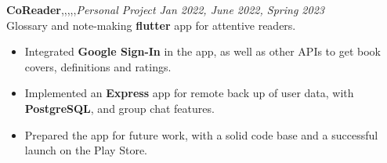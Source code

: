 \textbf{CoReader}\sep\flutter\sep\dart\sep\py\sep\django\sep{\it Personal Project} \hfill{\sl \small Jan 2022, June 2022, Spring 2023}\\
\vspace{-8pt}
\emerrow Glossary and note-making {\bf flutter} app for attentive readers.
\begin{itemize}[itemsep = -1.7 mm, leftmargin=*]
\item Integrated {\bf Google Sign-In} in the app, as well as other APIs to get book covers, definitions and ratings.
\item Implemented an {\bf Express } app for remote back up of user data, with \textbf{PostgreSQL}, and group chat features.
\item Prepared the app for future work, with a solid code base and a successful launch on the Play Store.
\end{itemize}
